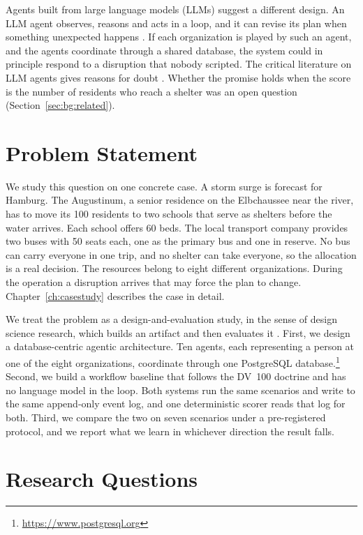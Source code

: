 Agents built from large language models (LLMs) suggest a different design. An
LLM agent observes, reasons and acts in a loop, and it can revise its plan when
something unexpected happens \parencite{yao2023}. If each organization is
played by such an agent, and the agents coordinate through a shared database,
the system could in principle respond to a disruption that nobody scripted.
The critical literature on LLM agents gives reasons for
doubt \parencite{kambhampati2024,cemri2025}. Whether the promise holds when the score is the
number of residents who reach a shelter was an open question
(Section~\ref{sec:bg:related}).

\section{Problem Statement}
\label{sec:intro:problem}

We study this question on one concrete case. A storm surge is forecast for
Hamburg. The Augustinum, a senior residence on the Elbchaussee near the river,
has to move its 100 residents to two schools that serve as shelters before the
water arrives. Each school offers 60 beds. The local transport company provides
two buses with 50 seats each, one as the primary bus and one in reserve. No bus
can carry everyone in one trip, and no shelter can take everyone, so the
allocation is a real decision. The resources belong to eight different
organizations. During the operation a disruption arrives that may force the
plan to change. Chapter~\ref{ch:casestudy} describes the case in detail.

We treat the problem as a design-and-evaluation study, in the sense of design
science research, which builds an artifact and then evaluates it
\parencite{hevner2004}. First, we design a
database-centric agentic architecture. Ten agents, each representing a person
at one of the eight organizations, coordinate through one PostgreSQL
database.\footnote{\url{https://www.postgresql.org}}
Second, we build a workflow baseline that follows the DV~100 doctrine and has no
language model in the loop. Both systems run the same scenarios and write to
the same append-only event log, and one deterministic scorer reads that log for
both. Third, we compare the two on seven scenarios under a pre-registered
protocol, and we report what we learn in whichever direction the result falls.

\section{Research Questions}
\label{sec:intro:rq}


